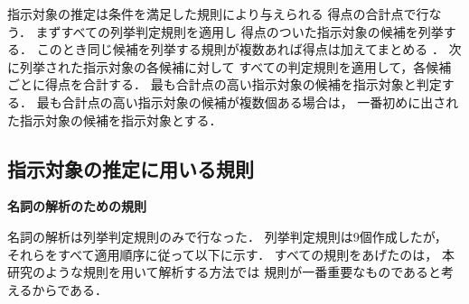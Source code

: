 指示対象の推定は条件を満足した規則により与えられる
得点の合計点で行なう．
まずすべての列挙判定規則を適用し
得点のついた指示対象の候補を列挙する．
このとき同じ候補を列挙する規則が複数あれば得点は加えてまとめる
．
次に列挙された指示対象の各候補に対して
すべての判定規則を適用して，各候補ごとに得点を合計する．
最も合計点の高い指示対象の候補を指示対象と判定する．
最も合計点の高い指示対象の候補が複数個ある場合は，
一番初めに出された指示対象の候補を指示対象とする．

\subsection{指示対象の推定に用いる規則}

{\bf 名詞の解析のための規則}

名詞の解析は列挙判定規則のみで行なった．
列挙判定規則は9個作成したが，
それらをすべて適用順序に従って以下に示す．
すべての規則をあげたのは，
本研究のような規則を用いて解析する方法では
規則が一番重要なものであると考えるからである．



